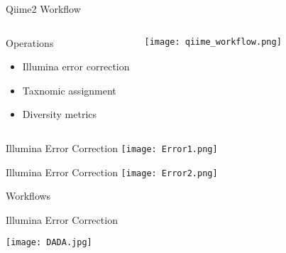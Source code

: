 \documentclass[11pt]{beamer}
\begin{document}
	
	\begin{frame}{Qiime2 Workflow}
	\begin{columns}
	\hspace{2cm}
	\begin{block}{Operations}
	\begin{itemize}
	\item \alert{Illumina error correction}
	
	
	\color{blues}
	\item Taxnomic assignment
	
	\color{amber}
	\item Diversity metrics
  \end{itemize}
  \end{block}
  
	\centering
	\texttt{[image: qiime\_workflow.png]}
	\end{columns}
	\end{frame}
	
	
	\begin{frame}{Illumina Error Correction}
	\centering
	\texttt{[image: Error1.png]}
	\end{frame}
	
	\begin{frame}{Illumina Error Correction}
	\centering
	\texttt{[image: Error2.png]}
	\end{frame}
	
	
	
	\begin{frame}{Workflows}
	\begin{block}{Illumina Error Correction}
	\end{block}
	\centering
	\texttt{[image: DADA.jpg]}
	\hspace{-2cm}
	
	\end{frame}
	
		
\end{document}
